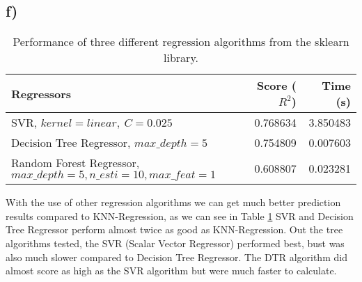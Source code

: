 \documentclass{article}
\begin{document}
        \subsection{f)}
          \begin{table}[h]
            \centering
            \label{tbl:task1f}
            \begin{tabular}{lrr}
              \toprule
              {Regressors} &     Score ($R^2$) &  Time (s) \\
              \midrule
              SVR,  $kernel=linear,~C=0.025$    &  0.768634 &  3.850483 \\
              Decision Tree Regressor, $max\_depth=5$ &  0.754809 &  0.007603 \\
              Random Forest Regressor, $max\_depth=5, n\_esti=10, max\_feat=1$ &  0.608807 &  0.023281 \\
              \bottomrule
            \end{tabular}
            \caption{Performance of three different regression algorithms from the sklearn library.}
          \end{table}
          With the use of other regression algorithms we can get much better prediction results compared to KNN-Regression, as we can see in Table \ref{tbl:task1f} SVR and Decision Tree Regressor 
          perform almost twice as good as KNN-Regression. Out the tree algorithms tested, the SVR (Scalar Vector Regressor) performed best, bust was also much slower compared to Decision Tree Regressor. 
          The DTR algorithm did almost score as high as the SVR algorithm but were much faster to calculate.
\end{document}
